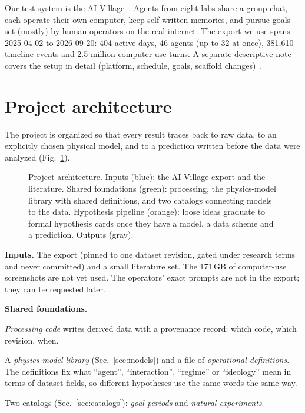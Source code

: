 \documentclass[reprint,aps,pre,10pt,superscriptaddress,nofootinbib]{revtex4-2}
\newenvironment{tight}{\begin{list}{\textbullet}{\setlength{\itemsep}{0pt}\setlength{\parsep}{0pt}\setlength{\topsep}{2pt}\setlength{\partopsep}{0pt}\setlength{\leftmargin}{1.1em}\setlength{\labelwidth}{0.6em}\setlength{\labelsep}{0.4em}}}{\end{list}}
\begin{document}
Our test system is the AI Village~\cite{aivillage}. Agents from eight labs share a group chat, each operate their own computer, keep self-written memories, and pursue goals set (mostly) by human operators on the real internet. The export we use spans 2025-04-02 to 2026-09-20: 404 active days, 46 agents (up to 32 at once), 381,610 timeline events and 2.5 million computer-use turns. A separate descriptive note covers the setup in detail (platform, schedule, goals, scaffold changes)~\cite{overview}.

\section{Project architecture}

The project is organized so that every result traces back to raw data, to an explicitly chosen physical model, and to a prediction written before the data were analyzed (Fig.~\ref{fig:arch}).

\begin{figure}[t]
\centering

\caption{Project architecture. Inputs (blue): the AI Village export and the literature. Shared foundations (green): processing, the physics-model library with shared definitions, and two catalogs connecting models to the data. Hypothesis pipeline (orange): loose ideas graduate to formal hypothesis cards once they have a model, a data scheme and a prediction. Outputs (gray).}
\label{fig:arch}
\end{figure}

\textbf{Inputs.} The export (pinned to one dataset revision, gated under research terms and never committed) and a small literature set. The 171\,GB of computer-use screenshots are not yet used. The operators' exact prompts are not in the export; they can be requested later.

\textbf{Shared foundations.}
\begin{tight}
\item \emph{Processing code} writes derived data with a provenance record: which code, which revision, when.
\item A \emph{physics-model library} (Sec.~\ref{sec:models}) and a file of \emph{operational definitions}. The definitions fix what ``agent'', ``interaction'', ``regime'' or ``ideology'' mean in terms of dataset fields, so different hypotheses use the same words the same way.
\item Two catalogs (Sec.~\ref{sec:catalogs}): \emph{goal periods} and \emph{natural experiments}.
\end{tight}
\end{document}
